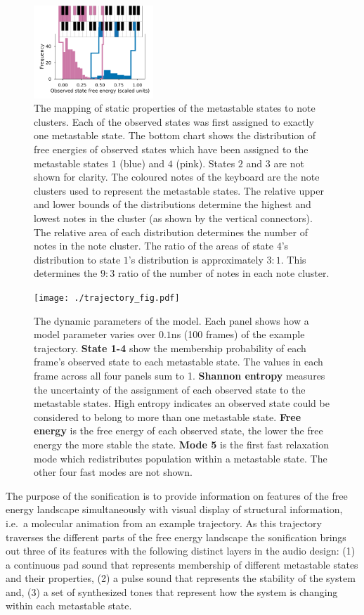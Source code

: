 \documentclass[a4paper,10pt,oneside]{article}
\begin{document}
\begin{sloppy}
\begin{figure}[th]
\includegraphics[width=0.4\textwidth]{./distribution_to_cluster_1+4.png}
\caption{The mapping of static properties of the metastable states to note clusters. Each of the observed states was first assigned to exactly one metastable state. The bottom chart shows the distribution of free energies of observed states which have been assigned to the metastable states $1$ (blue) and $4$ (pink). States $2$ and $3$ are not shown for clarity.  The coloured notes of the keyboard are the note clusters used to represent the metastable states. The relative upper and lower bounds of the distributions determine the highest and lowest notes in the cluster (as shown by the vertical connectors).  The relative area of each distribution determines the number of notes in the note cluster. The ratio of the areas of state $4$'s distribution to state $1$'s distribution is approximately $3:1$. This determines the $9:3$ ratio of the number of notes in each note cluster.}\label{fig:staticprop}
\end{figure}

\begin{figure}[t]
\texttt{[image: ./trajectory\_fig.pdf]}
\caption{The dynamic parameters of the model. Each panel shows how a model parameter varies over $0.1$ns (100 frames) of the example trajectory. \textbf{State 1-4} show the membership probability of each frame's observed state to each metastable state. The values in each frame across all four panels sum to 1. \textbf{Shannon entropy} measures the uncertainty of the assignment of each observed state to the metastable states.  High entropy indicates an observed state could be considered to belong to more than one metastable state. \textbf{Free energy} is the free energy of each observed state, the lower the free energy the more stable the state.  \textbf{Mode 5} is the first fast relaxation mode which redistributes population within a metastable state. The other four fast modes are not shown.}\label{fig:dynprop}
\end{figure}

The purpose of the sonification is to provide information on features of the free energy landscape simultaneously with visual display of structural information, i.e.\ a molecular animation from an example trajectory.  As this trajectory traverses the different parts of the free energy landscape the sonification brings out three of its features with the following distinct layers in the audio design: (1) a continuous pad sound that represents membership of different metastable states and their properties, (2) a pulse sound that represents the stability of the system and, (3) a set of synthesized tones that represent how the system is changing within each metastable state.


\end{sloppy}
\end{document}
